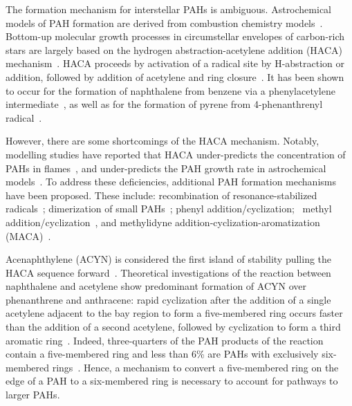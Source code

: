 \documentclass[journal=jacsat,manuscript=article,layout=onecolumn]{achemso}
\begin{document}

The formation mechanism for interstellar PAHs is ambiguous. Astrochemical models of PAH formation are derived from combustion chemistry models~\cite{fre89}. Bottom-up molecular growth processes in circumstellar envelopes of carbon-rich stars are largely based on the hydrogen abstraction-acetylene addition (HACA) mechanism~\cite{tie13}. HACA proceeds by activation of a radical site by H-abstraction or addition, followed by addition of acetylene and ring closure~\cite{fre85}.  It has been shown to occur for the formation of naphthalene from benzene via a phenylacetylene intermediate~\cite{par14,yan16}, as well as for the formation of pyrene from 4-phenanthrenyl radical~\cite{zha18}.

However, there are some shortcomings of the HACA mechanism. Notably, modelling studies have reported that HACA under-predicts the concentration of PAHs in flames~\cite{raj12}, and under-predicts the PAH growth rate in astrochemical models~\cite{mic10a,mic10b,mic11}. To address these deficiencies, additional PAH formation mechanisms have been proposed. These include: recombination of resonance-stabilized radicals~\cite{mel96,mil92,joh18}; dimerization of small PAHs~\cite{sie00}; phenyl addition/cyclization;~\cite{shu08} methyl addition/cyclization~\cite{shu10}, and methylidyne addition-cyclization-aromatization (MACA)~\cite{dod21}. %

Acenaphthylene (ACYN) is considered the first island of stability pulling the HACA sequence forward~\cite{fre20}. Theoretical investigations of the reaction between naphthalene and acetylene show predominant formation of ACYN over phenanthrene and anthracene: rapid cyclization after the addition of a single acetylene adjacent to the bay region to form a five-membered ring occurs faster than the addition of a second acetylene, followed by cyclization to form a third aromatic ring~\cite{kis13}. Indeed, three-quarters of the PAH products of the reaction contain a five-membered ring and less than 6\% are PAHs with exclusively six-membered rings~\cite{kis13}. Hence, a mechanism to convert a five-membered ring on the edge of a PAH to a six-membered ring is necessary to account for pathways to larger PAHs. %
\end{document}
